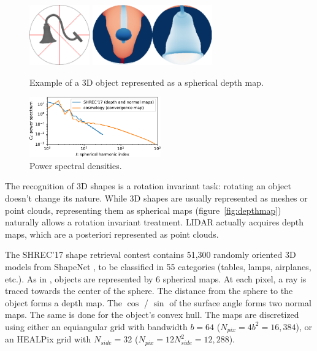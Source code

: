 \documentclass{article} %
\renewcommand{\figref}[1]{figure~\ref{fig:#1}}
\begin{document}
\begin{figure}
	\begin{minipage}[t]{0.57\linewidth}
		\centering
		\includegraphics[height=7em]{lamp_000018}
		\hfill
		\includegraphics[height=7em]{lamp_000018_sphere_nobar}
		\caption{Example of a 3D object represented as a spherical depth map.}
		\label{fig:depthmap}
	\end{minipage}
	\hfill
	\begin{minipage}[t]{0.35\linewidth}
		\centering
		\includegraphics[height=7em]{spectrum}
		\caption{Power spectral densities.}
		\label{fig:spectrum}
	\end{minipage}
\end{figure}

The recognition of 3D shapes is a rotation invariant task: rotating an object doesn't change its nature.
While 3D shapes are usually represented as meshes or point clouds, representing them as spherical maps (\figref{depthmap}) naturally allows a rotation invariant treatment.
LIDAR actually acquires depth maps, which are a posteriori represented as point clouds.

The SHREC'17 shape retrieval contest \citep{shrec17} contains 51,300 randomly oriented 3D models from ShapeNet \citep{shapenet}, to be classified in 55 categories (tables, lamps, airplanes, etc.).
As in \citet{cohen2018sphericalcnn}, objects are represented by 6 spherical maps.
At each pixel, a ray is traced towards the center of the sphere.
The distance from the sphere to the object forms a depth map.
The $\cos$ / $\sin$ of the surface angle forms two normal maps.
The same is done for the object's convex hull.
The maps are discretized using either an equiangular grid \citep{driscoll1994Fouriersphere} with bandwidth $b = 64$ ($N_{pix} = 4 b^2 = 16,384$), or an HEALPix \citep{healpix} grid with $N_{side} = 32$ ($N_{pix} = 12 N_{side}^2 = 12,288$).
\end{document}
